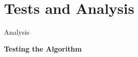 \documentclass[fleqn,11pt,aspectratio=43]{beamer}
\begin{document}

\section{Tests and Analysis}





\begin{frame}[c]{Analysis}
\centering
\vspace{0.5cm}

\Large\textbf{Testing the Algorithm}



\end{frame}
\end{document}
